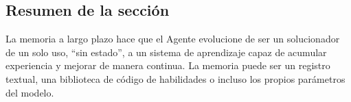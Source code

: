 \subsection{Resumen de la sección}

La memoria a largo plazo hace que el Agente evolucione de ser un solucionador de un solo uso, ``sin estado'', a un sistema de aprendizaje capaz de acumular experiencia y mejorar de manera continua. La memoria puede ser un registro textual, una biblioteca de código de habilidades o incluso los propios parámetros del modelo.
